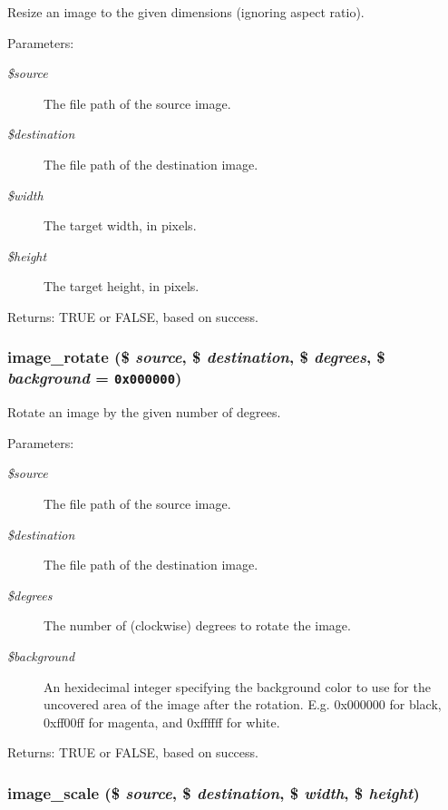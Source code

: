 Resize an image to the given dimensions (ignoring aspect ratio).

\begin{Desc}
\item[Parameters:]
\begin{description}
\item[{\em \$source}]The file path of the source image. \item[{\em \$destination}]The file path of the destination image. \item[{\em \$width}]The target width, in pixels. \item[{\em \$height}]The target height, in pixels. \end{description}
\end{Desc}
\begin{Desc}
\item[Returns:]TRUE or FALSE, based on success. \end{Desc}
\hypertarget{group__image_g6827b6bfbfee059fa956f5c3d6f0d716}{
\subsubsection[{image\_\-rotate}]{\setlength{\rightskip}{0pt plus 5cm}image\_\-rotate (\$ {\em source}, \/  \$ {\em destination}, \/  \$ {\em degrees}, \/  \$ {\em background} = {\tt 0x000000})}}
\label{group__image_g6827b6bfbfee059fa956f5c3d6f0d716}


Rotate an image by the given number of degrees.

\begin{Desc}
\item[Parameters:]
\begin{description}
\item[{\em \$source}]The file path of the source image. \item[{\em \$destination}]The file path of the destination image. \item[{\em \$degrees}]The number of (clockwise) degrees to rotate the image. \item[{\em \$background}]An hexidecimal integer specifying the background color to use for the uncovered area of the image after the rotation. E.g. 0x000000 for black, 0xff00ff for magenta, and 0xffffff for white. \end{description}
\end{Desc}
\begin{Desc}
\item[Returns:]TRUE or FALSE, based on success. \end{Desc}
\hypertarget{group__image_g4015f61f8b5214787a6f649befd4b7bb}{
\subsubsection[{image\_\-scale}]{\setlength{\rightskip}{0pt plus 5cm}image\_\-scale (\$ {\em source}, \/  \$ {\em destination}, \/  \$ {\em width}, \/  \$ {\em height})}}
\label{group__image_g4015f61f8b5214787a6f649befd4b7bb}



